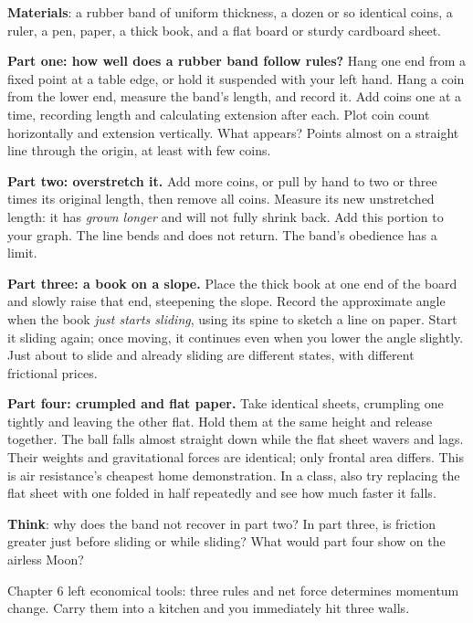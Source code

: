 \begin{experiment}
\textbf{Materials}: a rubber band of uniform thickness, a dozen or so identical coins, a ruler, a pen, paper, a thick book, and a flat board or sturdy cardboard sheet.

\textbf{Part one: how well does a rubber band follow rules?} Hang one end from a fixed point at a table edge, or hold it suspended with your left hand. Hang a coin from the lower end, measure the band's length, and record it. Add coins one at a time, recording length and calculating extension after each. Plot coin count horizontally and extension vertically. What appears? Points almost on a straight line through the origin, at least with few coins.

\textbf{Part two: overstretch it.} Add more coins, or pull by hand to two or three times its original length, then remove all coins. Measure its new unstretched length: it has \emph{grown longer} and will not fully shrink back. Add this portion to your graph. The line bends and does not return. The band's obedience has a limit.

\textbf{Part three: a book on a slope.} Place the thick book at one end of the board and slowly raise that end, steepening the slope. Record the approximate angle when the book \emph{just starts sliding}, using its spine to sketch a line on paper. Start it sliding again; once moving, it continues even when you lower the angle slightly. Just about to slide and already sliding are different states, with different frictional prices.

\textbf{Part four: crumpled and flat paper.} Take identical sheets, crumpling one tightly and leaving the other flat. Hold them at the same height and release together. The ball falls almost straight down while the flat sheet wavers and lags. Their weights and gravitational forces are identical; only frontal area differs. This is air resistance's cheapest home demonstration. In a class, also try replacing the flat sheet with one folded in half repeatedly and see how much faster it falls.

\textbf{Think}: why does the band not recover in part two? In part three, is friction greater just before sliding or while sliding? What would part four show on the airless Moon?
\end{experiment}


Chapter 6 left economical tools: three rules and net force determines momentum change. Carry them into a kitchen and you immediately hit three walls.

